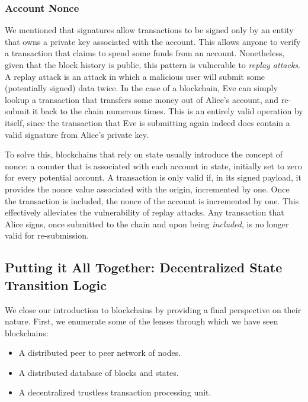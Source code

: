 \subsubsection{Account Nonce} \label{chap_bg:subsec:nonce}

We mentioned that signatures allow transactions to be signed only by an entity that owns a private
key associated with the account. This allows anyone to verify a transaction that claims to spend
some funds from an account. Nonetheless, given that the block history is public, this pattern is
vulnerable to \textit{replay attacks}. A replay attack is an attack in which a malicious user will
submit some (potentially signed) data twice. In the case of a blockchain, Eve can simply lookup a
transaction that transfers some money out of Alice's account, and re-submit it back to the chain
numerous times. This is an entirely valid operation by itself, since the transaction that Eve is
submitting again indeed does contain a valid signature from Alice's private key.

To solve this, blockchains that rely on state usually introduce the concept of nonce: a counter that
is associated with each account in state, initially set to zero for every potential account. A
transaction is only valid if, in its signed payload, it provides the nonce value associated with the
origin, incremented by one. Once the transaction is included, the nonce of the account is
incremented by one. This effectively alleviates the vulnerability of replay attacks. Any transaction
that Alice signs, once submitted to the chain and upon being \textit{included}, is no longer valid
for re-submission.


\subsection{Putting it All Together: Decentralized State Transition Logic}
\label{chap_bg:subsec:decentralized_state_machine}

We close our introduction to blockchains by providing a final perspective on their nature. First, we
enumerate some of the lenses through which we have seen blockchains:

\begin{itemize}
	\item A distributed peer to peer network of nodes.
	\item A distributed database of blocks and states.
	\item A decentralized trustless transaction processing unit.
\end{itemize}

